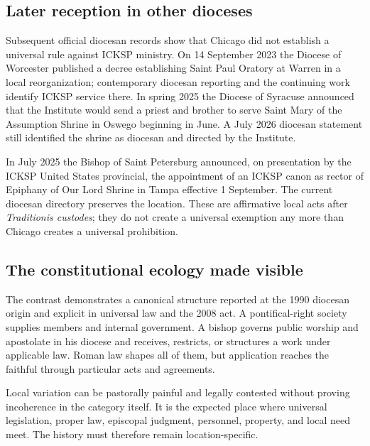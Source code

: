 \subsection{Later reception in other dioceses}

Subsequent official diocesan records show that Chicago did not establish a universal rule against ICKSP ministry. On 14 September 2023 the Diocese of Worcester published a decree establishing Saint Paul Oratory at Warren in a local reorganization; contemporary diocesan reporting and the continuing work identify ICKSP service there. In spring 2025 the Diocese of Syracuse announced that the Institute would send a priest and brother to serve Saint Mary of the Assumption Shrine in Oswego beginning in June. A July 2026 diocesan statement still identified the shrine as diocesan and directed by the Institute.

In July 2025 the Bishop of Saint Petersburg announced, on presentation by the ICKSP United States provincial, the appointment of an ICKSP canon as rector of Epiphany of Our Lord Shrine in Tampa effective 1 September. The current diocesan directory preserves the location. These are affirmative local acts after \emph{Traditionis custodes}; they do not create a universal exemption any more than Chicago creates a universal prohibition.

\subsection{The constitutional ecology made visible}

The contrast demonstrates a canonical structure reported at the 1990 diocesan origin and explicit in universal law and the 2008 act. A pontifical-right society supplies members and internal government. A bishop governs public worship and apostolate in his diocese and receives, restricts, or structures a work under applicable law. Roman law shapes all of them, but application reaches the faithful through particular acts and agreements.

Local variation can be pastorally painful and legally contested without proving incoherence in the category itself. It is the expected place where universal legislation, proper law, episcopal judgment, personnel, property, and local need meet. The history must therefore remain location-specific.

